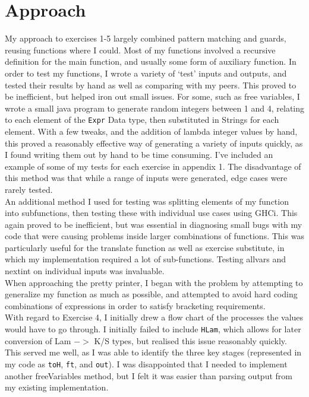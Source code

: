 \section{Approach}
\begin{normalsize}
My approach to exercises 1-5 largely combined pattern matching and guards, reusing functions where I could. Most of my functions involved a recursive definition for the main function, and usually some form of auxiliary function.  In order to test my functions, I wrote a variety of ‘test’ inputs and outputs, and tested their results by hand as well as comparing with my peers. This proved to be inefficient, but helped iron out small issues. For some, such as free variables, I wrote a small java program to generate random integers between 1 and 4, relating to each element of the \texttt{Expr} Data type, then substituted in Strings for each element. With a few tweaks, and the addition of lambda integer values by hand, this proved a reasonably effective way of generating a variety of inputs quickly, as I found writing them out by hand to be time consuming.  I’ve included an example of some of my tests for each exercise in appendix 1. The disadvantage of this method was that while a range of inputs were generated, edge cases were rarely tested. \\
An additional method I used for testing was splitting elements of my function into subfunctions, then testing these with individual use cases using GHCi. This again proved to be inefficient, but was essential in diagnosing small bugs with my code that were causing problems inside larger combinations of functions. This was particularly useful for the translate function as well as exercise substitute, in which my implementation required a lot of sub-functions. Testing allvars and nextint on individual inputs was invaluable. \\
When approaching the pretty printer, I began with the problem by attempting to generalize my function as much as possible, and attempted to avoid hard coding combinations of expressions in order to satisfy bracketing requirements.  \\
With regard to Exercise 4, I initially drew a flow chart of the processes the values would have to go through. I initially failed to include \texttt{HLam}, which allows for later conversion of Lam $->$ K/S types, but realised this issue reasonably quickly. This served me well, as I was able to identify the three key stages (represented in my code as \texttt{toH}, \texttt{ft}, and \texttt{out}). I was disappointed that I needed to implement another freeVariables method, but I felt it was easier than parsing output from my existing implementation. 
\end{normalsize}

